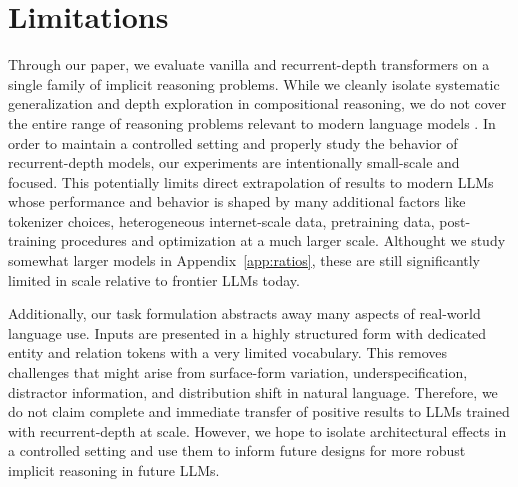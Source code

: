 \section{Limitations}

Through our paper, we evaluate vanilla and recurrent-depth transformers on a single family of implicit reasoning problems. While we cleanly isolate systematic generalization and depth exploration in compositional reasoning, we do not cover the entire range of reasoning problems relevant to modern language models \citep{huang2023towards}. In order to maintain a controlled setting and properly study the behavior of recurrent-depth models, our experiments are intentionally small-scale and focused. This potentially limits direct extrapolation of results to modern LLMs whose performance and behavior is shaped by many additional factors like tokenizer choices, heterogeneous internet-scale data, pretraining data, post-training procedures and optimization at a much larger scale. Althought we study somewhat larger models in Appendix~\ref{app:ratios}, these are still significantly limited in scale relative to frontier LLMs today.

Additionally, our task formulation abstracts away many aspects of real-world language use. Inputs are presented in a highly structured form with dedicated entity and relation tokens with a very limited vocabulary. This removes challenges that might arise from surface-form variation, underspecification, distractor information, and distribution shift in natural language. Therefore, we do not claim complete and immediate transfer of positive results to LLMs trained with recurrent-depth at scale. However, we hope to isolate architectural effects in a controlled setting and use them to inform future designs for more robust implicit reasoning in future LLMs.


